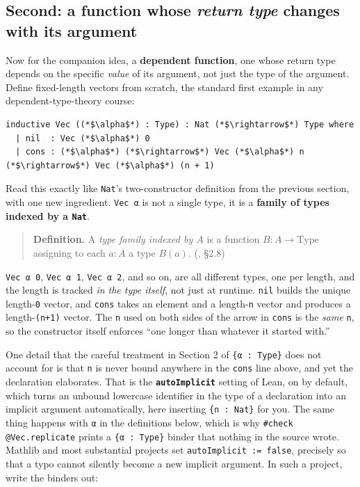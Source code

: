\subsection{\texorpdfstring{Second: a function whose \emph{return type} changes with its argument}{Second: a function whose return type changes with its argument}}\label{sec:01-basics:03-dependent-types:4}

Now for the companion idea, a \textbf{dependent function}, one whose return type depends on the specific \emph{value} of its argument, not just the type of the argument. Define fixed-length vectors from scratch, the standard first example in any dependent-type-theory course:

\begin{lstlisting}
inductive Vec ((*$\alpha$*) : Type) : Nat (*$\rightarrow$*) Type where
  | nil  : Vec (*$\alpha$*) 0
  | cons : (*$\alpha$*) (*$\rightarrow$*) Vec (*$\alpha$*) n (*$\rightarrow$*) Vec (*$\alpha$*) (n + 1)
\end{lstlisting}

Read this exactly like \texttt{Nat}'s two-constructor definition from the previous section, with one new ingredient. \texttt{Vec α} is not a single type, it is a \textbf{family of types indexed by a \texttt{Nat}}.

\begin{quote}
\textbf{Definition.} A \emph{type family indexed by \(A\)} is a function \(B : A \to
\mathrm{Type}\) assigning to each \(a : A\) a type \(B(a)\). (\cite{TPIL4}, §2.8)
\end{quote}

\texttt{Vec α 0}, \texttt{Vec α 1}, \texttt{Vec α 2}, and so on, are all different types, one per length, and the length is tracked \emph{in the type itself}, not just at runtime. \texttt{nil} builds the unique length-\texttt{0} vector, and \texttt{cons} takes an element and a length-\texttt{n} vector and produces a length-\texttt{(n+1)} vector. The \texttt{n} used on both sides of the arrow in \texttt{cons} is the \emph{same} \texttt{n}, so the constructor itself enforces ``one longer than whatever it started with.''

One detail that the careful treatment in Section 2 of \texttt{\{α : Type\}} does not account for is that \texttt{n} is never bound anywhere in the \texttt{cons} line above, and yet the declaration elaborates. That is the \textbf{\texttt{autoImplicit}} setting of Lean, on by default, which turns an unbound lowercase identifier in the type of a declaration into an implicit argument automatically, here inserting \texttt{\{n : Nat\}} for you. The same thing happens with \texttt{α} in the definitions below, which is why \texttt{\#check @Vec.replicate} prints a \texttt{\{α : Type\}} binder that nothing in the source wrote. Mathlib and most substantial projects set \texttt{autoImplicit := false}, precisely so that a typo cannot silently become a new implicit argument. In such a project, write the binders out:

